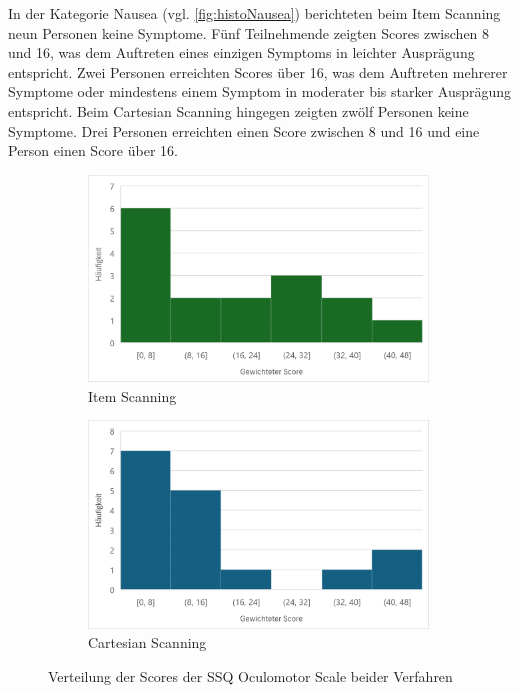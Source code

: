 In der Kategorie Nausea (vgl. \autoref{fig:histoNausea}) berichteten beim Item Scanning neun Personen keine Symptome. Fünf Teilnehmende zeigten Scores zwischen 8 und 16, was dem Auftreten eines einzigen Symptoms in leichter Ausprägung entspricht. Zwei Personen erreichten Scores über 16, was dem Auftreten mehrerer Symptome oder mindestens einem Symptom in moderater bis starker Ausprägung entspricht. Beim Cartesian Scanning hingegen zeigten zwölf Personen keine Symptome. Drei Personen erreichten einen Score zwischen 8 und 16 und eine Person einen Score über 16. 

\begin{figure}
    \centering
    \begin{subfigure}{.5\textwidth}
        \centering
        \includegraphics[width=0.99\textwidth]{images/Results/Histogramm-Oculomotor-Scale-Item.png}
        \caption{Item Scanning}
        \label{fig:histoOculomotorItem}   
    \end{subfigure}%
    \begin{subfigure}{.5\textwidth}
        \centering
        \includegraphics[width=0.99\textwidth]{images/Results/Histogramm-Oculomotor-Scale-Cartesian.png}
         \caption{Cartesian Scanning}
         \label{fig:histoOculomotorCartesian}
    \end{subfigure}
    \caption{Verteilung der Scores der SSQ Oculomotor Scale beider Verfahren}
    \label{fig:histoOculomotor}
\end{figure}

